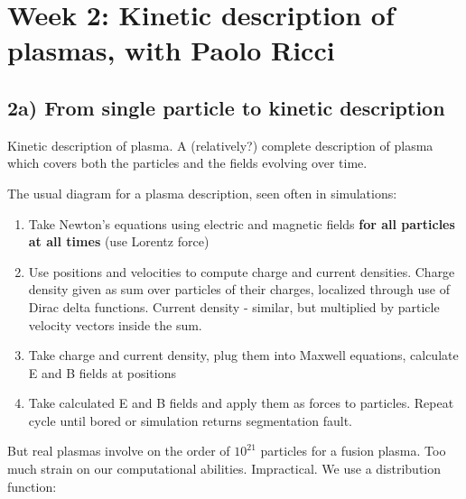 \section{Week 2: Kinetic description of plasmas, with Paolo Ricci}
\subsection{2a) From single particle to kinetic description }
	Kinetic description of plasma. A (relatively?) complete description of plasma which covers both the particles and the fields evolving over time.

The usual diagram for a plasma description, seen often in simulations:
\begin{enumerate}
	\item Take Newton's equations using electric and magnetic fields \textbf{for all particles at all times} (use Lorentz force)
	\item Use positions and velocities to compute charge and current densities. Charge density given as sum over particles of their charges, localized through use of Dirac delta functions. Current density - similar, but multiplied by particle velocity vectors inside the sum.
	\item Take charge and current density, plug them into Maxwell equations, calculate E and B fields at positions
	\item Take calculated E and B fields and apply them as forces to particles. Repeat cycle until bored or simulation returns segmentation fault.
\end{enumerate}
But real plasmas involve on the order of $10^{21}$ particles for a fusion plasma. Too much strain on our computational abilities. Impractical. We use a distribution function:


